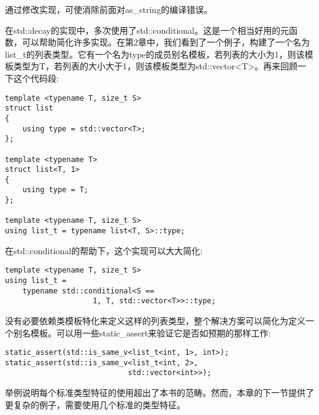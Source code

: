 通过修改实现，可使消除前面对as\_string的编译错误。

在std::decay的实现中，多次使用了std::conditional。这是一个相当好用的元函数，可以帮助简化许多实现。在第2章中，我们看到了一个例子，构建了一个名为list\_t的列表类型。它有一个名为type的成员别名模板，若列表的大小为1，则该模板类型为T，若列表的大小大于1，则该模板类型为std::vector<T>。再来回顾一下这个代码段:

\begin{lstlisting}[style=styleCXX]
template <typename T, size_t S>
struct list
{
	using type = std::vector<T>;
};

template <typename T>
struct list<T, 1>
{
	using type = T;
};

template <typename T, size_t S>
using list_t = typename list<T, S>::type;
\end{lstlisting}

在std::conditional的帮助下，这个实现可以大大简化:

\begin{lstlisting}[style=styleCXX]
template <typename T, size_t S>
using list_t =
	typename std::conditional<S ==
					1, T, std::vector<T>>::type;
\end{lstlisting}

没有必要依赖类模板特化来定义这样的列表类型，整个解决方案可以简化为定义一个别名模板。可以用一些static\_assert来验证它是否如预期的那样工作:

\begin{lstlisting}[style=styleCXX]
static_assert(std::is_same_v<list_t<int, 1>, int>);
static_assert(std::is_same_v<list_t<int, 2>,
							std::vector<int>>);
\end{lstlisting}

举例说明每个标准类型特征的使用超出了本书的范畴。然而，本章的下一节提供了更复杂的例子，需要使用几个标准的类型特征。



























